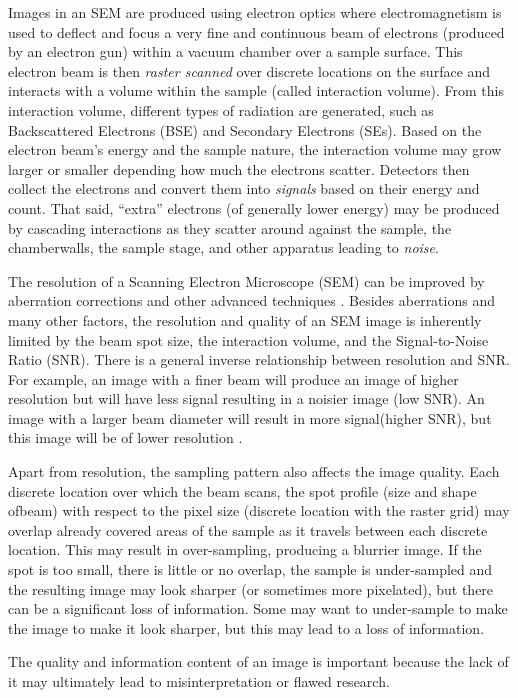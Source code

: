 \documentclass{article}
\begin{document}
Images in an SEM are produced using electron optics where electromagnetism is
used to deflect and focus a very fine and continuous beam of electrons
(produced by an electron gun) within a vacuum chamber over a sample surface. This
electron beam is then {\it raster scanned} over discrete locations on the surface
and interacts with a volume within the sample (called interaction
volume)\cite{goldstein_image_2018}. From this interaction volume, different
types of radiation are generated, such as Backscattered Electrons (BSE) and
Secondary Electrons (SEs). Based on the electron beam’s energy and the sample
nature, the interaction volume may grow larger or smaller depending how much the
electrons scatter. Detectors then collect the electrons and convert them into
{\it signals} based on their energy and count. That said, “extra” electrons (of
generally lower energy) may be produced by cascading interactions as they
scatter around against the sample, the chamberwalls, the sample stage, and other
apparatus leading to {\it noise}.

The resolution of a Scanning Electron Microscope (SEM) can be improved by
aberration corrections and other advanced techniques \cite{joy_dc_2005}.
Besides aberrations and many other factors, the resolution and quality of an SEM
image is inherently limited by the beam spot size, the interaction volume, and
the Signal-to-Noise Ratio (SNR). There is a general inverse relationship between
resolution and SNR. For example, an image with a finer beam will produce an
image of higher resolution but will have less signal resulting in a noisier
image (low SNR). An image with a larger beam diameter will result in more
signal(higher SNR), but this image will be of lower resolution
\cite{jeol_scanning_2013}.

Apart from resolution, the sampling pattern also affects the image quality.
Each discrete location over which the beam scans, the spot profile (size and
shape ofbeam) with respect to the pixel size (discrete location with the raster
grid) may overlap already covered areas of the sample as it travels between each
discrete location. This may result in over-sampling, producing a blurrier
image. If the spot is too small, there is little or no overlap, the sample is
under-sampled and the resulting image may look sharper (or sometimes more
pixelated), but there can be a significant loss of information. Some may want
to under-sample to make the image to make it look sharper, but this may lead to a
loss of information.

The quality and information content of an image is important because the lack of
it may ultimately lead to misinterpretation or flawed research.
\end{document}
